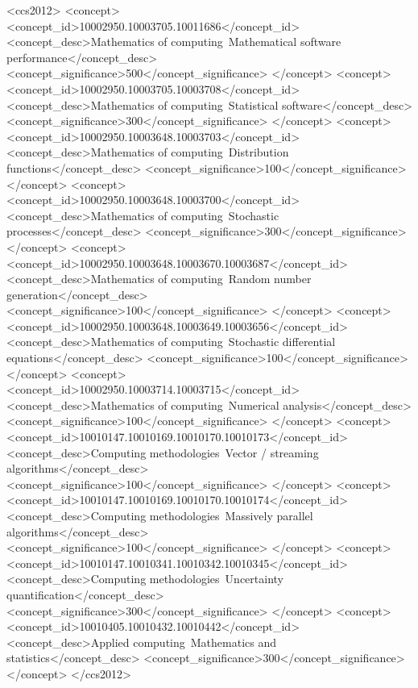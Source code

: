 \documentclass[manuscript,review]{acmart}
\begin{document}
\begin{CCSXML}
<ccs2012>
   <concept>
       <concept_id>10002950.10003705.10011686</concept_id>
       <concept_desc>Mathematics of computing~Mathematical software performance</concept_desc>
       <concept_significance>500</concept_significance>
       </concept>
   <concept>
       <concept_id>10002950.10003705.10003708</concept_id>
       <concept_desc>Mathematics of computing~Statistical software</concept_desc>
       <concept_significance>300</concept_significance>
       </concept>
   <concept>
       <concept_id>10002950.10003648.10003703</concept_id>
       <concept_desc>Mathematics of computing~Distribution functions</concept_desc>
       <concept_significance>100</concept_significance>
       </concept>
   <concept>
       <concept_id>10002950.10003648.10003700</concept_id>
       <concept_desc>Mathematics of computing~Stochastic processes</concept_desc>
       <concept_significance>300</concept_significance>
       </concept>
   <concept>
       <concept_id>10002950.10003648.10003670.10003687</concept_id>
       <concept_desc>Mathematics of computing~Random number generation</concept_desc>
       <concept_significance>100</concept_significance>
       </concept>
   <concept>
       <concept_id>10002950.10003648.10003649.10003656</concept_id>
       <concept_desc>Mathematics of computing~Stochastic differential equations</concept_desc>
       <concept_significance>100</concept_significance>
       </concept>
   <concept>
       <concept_id>10002950.10003714.10003715</concept_id>
       <concept_desc>Mathematics of computing~Numerical analysis</concept_desc>
       <concept_significance>100</concept_significance>
       </concept>
   <concept>
       <concept_id>10010147.10010169.10010170.10010173</concept_id>
       <concept_desc>Computing methodologies~Vector / streaming algorithms</concept_desc>
       <concept_significance>100</concept_significance>
       </concept>
   <concept>
       <concept_id>10010147.10010169.10010170.10010174</concept_id>
       <concept_desc>Computing methodologies~Massively parallel algorithms</concept_desc>
       <concept_significance>100</concept_significance>
       </concept>
   <concept>
       <concept_id>10010147.10010341.10010342.10010345</concept_id>
       <concept_desc>Computing methodologies~Uncertainty quantification</concept_desc>
       <concept_significance>300</concept_significance>
       </concept>
   <concept>
       <concept_id>10010405.10010432.10010442</concept_id>
       <concept_desc>Applied computing~Mathematics and statistics</concept_desc>
       <concept_significance>300</concept_significance>
       </concept>
 </ccs2012>
\end{CCSXML}
\end{document}
